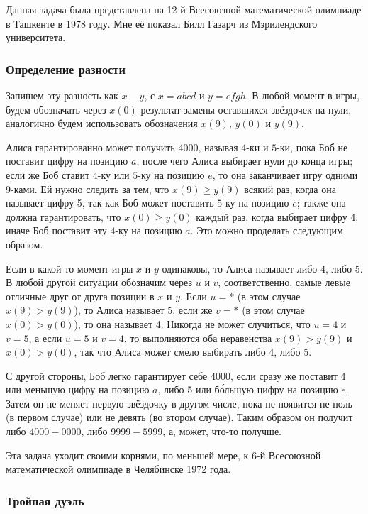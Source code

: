 Данная задача была представлена на 12-й Всесоюзной математической олимпиаде в Ташкенте в 1978 году.
Мне её показал Билл Газарч из Мэрилендского университета.%

\subsubsection*{Определение разности}%

Запишем эту разность как $x-y$, с $x=abcd$ и $y=efgh$.
В любой момент в игры, будем обозначать через $x(0)$ результат замены оставшихся звёздочек на нули, аналогично будем использовать обозначения $x(9)$, $y(0)$ и $y(9)$.

Алиса гарантированно может получить 4000, называя $4$-ки и $5$-ки, пока Боб не поставит цифру на позицию $a$, после чего Алиса выбирает нули до конца игры;
если же Боб ставит $4$-ку или $5$-ку на позицию $e$, то она заканчивает игру одними $9$-ками.
Ей нужно следить за тем, что $x(9)\ge y(9)$ всякий раз, когда она называет цифру 5, так как Боб может поставить $5$-ку на позицию $e$;
также она должна гарантировать, что $x(0)\ge y(0)$ каждый раз, когда выбирает цифру 4, иначе Боб поставит эту $4$-ку на позицию $a$.
Это можно проделать следующим образом.

Если в какой-то момент игры $x$ и $y$ одинаковы, то Алиса называет либо 4, либо 5.
В любой другой ситуации обозначим через $u$ и $v$, соответственно, самые левые отличные друг от друга позиции в $x$ и $y$.
Если $u=*$ (в этом случае $x(9)> y(9)$), то Алиса называет 5, если же $v=*$ (в этом случае $x(0)> y(0)$), то она называет 4.
Никогда не может случиться, что $u=4$ и $v=5$, а если $u=5$ и $v=4$, то выполняются оба неравенства $x(9)> y(9)$ и $x(0)> y(0)$, так что Алиса может смело выбирать либо 4, либо 5.

С другой стороны, Боб легко гарантирует себе 4000, если сразу же поставит 4 или меньшую цифру на позицию $a$, либо 5 или б\'{о}льшую цифру на позицию $e$.
Затем он не меняет первую звёздочку в другом числе, пока не появится не ноль (в первом случае) или не девять (во втором случае).
Таким образом он получит либо $4000-0000$, либо $9999-5999$, а, может, что-то получше.
\heart

Эта задача уходит своими корнями, по меньшей мере, к 6-й Всесоюзной математической олимпиаде в Челябинске 1972 года.

\subsubsection*{Тройная дуэль}%

